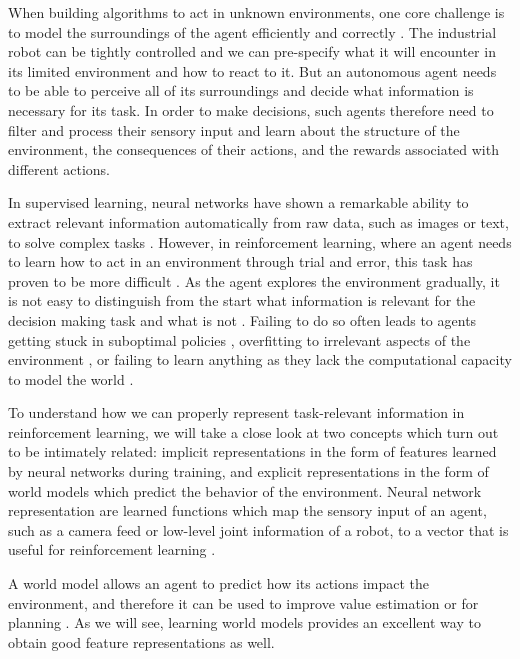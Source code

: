 When building algorithms to act in unknown environments, one core challenge is to model the surroundings of the agent efficiently and correctly \parencite{vaml}.
The industrial robot can be tightly controlled and we can pre-specify what it will encounter in its limited environment and how to react to it.
But an autonomous agent needs to be able to perceive all of its surroundings and decide what information is necessary for its task.
In order to make decisions, such agents therefore need to filter and process their sensory input and learn about the structure of the environment, the consequences of their actions, and the rewards associated with different actions.

In supervised learning, neural networks have shown a remarkable ability to extract relevant information automatically from raw data, such as images or text, to solve complex tasks \parencite{goodfellow2016deep}.
However, in reinforcement learning, where an agent needs to learn how to act in an environment through trial and error, this task has proven to be more difficult \parencite{jaderberg2017reinforcement,igl2021transient,lyle2021effect,kumar2021implicit,nikishin2022primacy,hussing2024dissecting}.
As the agent explores the environment gradually, it is not easy to distinguish from the start what information is relevant for the decision making task and what is not \parencite{igl2021transient,voelcker2022value}.
Failing to do so often leads to agents getting stuck in suboptimal policies \parencite{kumar2021implicit}, overfitting to irrelevant aspects of the environment \parencite{song2020observational}, or failing to learn anything as they lack the computational capacity to model the world \parencite{kumar2021implicit,nikishin2022primacy}.

To understand how we can properly represent task-relevant information in reinforcement learning, we will take a close look at two concepts which turn out to be intimately related: implicit representations in the form of features learned by neural networks during training, and explicit representations in the form of world models which predict the behavior of the environment.
Neural network representation are learned functions which map the sensory input of an agent, such as a camera feed or low-level joint information of a robot, to a vector that is useful for reinforcement learning \parencite{ferns2004metrics,jaderberg2017reinforcement,abel2020thesis,le2021metrics}.

A world model allows an agent to predict how its actions impact the environment, and therefore it can be used to improve value estimation or for planning \parencite{dyna,mbpo,hafner2020dream,schrittwieser2020mastering}.
As we will see, learning world models provides an excellent way to obtain good feature representations as well.


